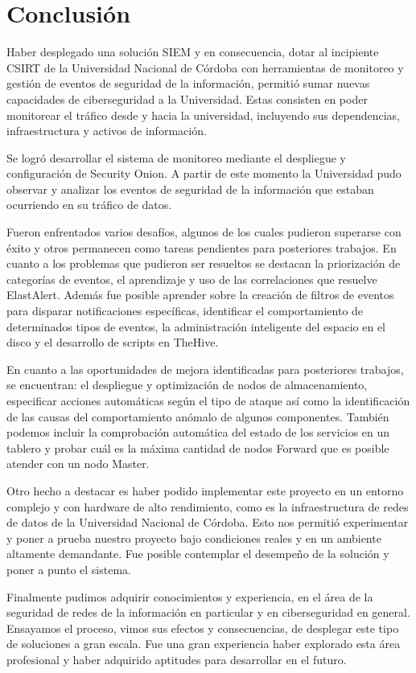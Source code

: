 \chapter{\Large Conclusión}
Haber desplegado una solución SIEM y en consecuencia, dotar al incipiente CSIRT de la Universidad Nacional de Córdoba con herramientas de monitoreo y gestión de eventos de seguridad de la información, permitió sumar nuevas capacidades de ciberseguridad a la Universidad. Estas consisten en poder monitorear el tráfico desde y hacia la universidad, incluyendo sus dependencias, infraestructura y activos de información.
 \par
Se logró desarrollar el sistema de monitoreo mediante el despliegue y configuración de Security Onion. A partir de este momento la Universidad pudo observar y analizar los eventos de seguridad de la información que estaban ocurriendo en su tráfico de datos.  \par
Fueron enfrentados varios desafíos, algunos de los cuales pudieron superarse con éxito y otros permanecen como tareas pendientes para posteriores trabajos. En cuanto a los problemas que pudieron ser resueltos se destacan la priorización de categorías de eventos, el aprendizaje y uso de las correlaciones que resuelve ElastAlert. Además fue posible aprender sobre la creación de filtros de eventos para disparar notificaciones específicas, identificar el comportamiento de determinados tipos de eventos, la administración inteligente del espacio en el disco y el desarrollo de scripts en TheHive. \par
En cuanto a las oportunidades de mejora identificadas para posteriores trabajos, se encuentran: el despliegue y optimización de nodos de almacenamiento, especificar acciones automáticas según el tipo de ataque así como la identificación de las causas del comportamiento anómalo de algunos componentes. También podemos incluir la comprobación automática del estado de los servicios en un tablero y probar cuál es la máxima cantidad de nodos Forward que es posible atender con un nodo Master. \par
Otro hecho a destacar es haber podido implementar este proyecto en un entorno complejo y con hardware de alto rendimiento, como es la infraestructura de redes de datos de la Universidad Nacional de Córdoba. Esto nos permitió experimentar y poner a prueba nuestro proyecto bajo condiciones reales y en un ambiente altamente demandante. Fue posible contemplar el desempeño de la solución y poner a punto el sistema. \par
Finalmente pudimos adquirir conocimientos y experiencia, en el área de la seguridad de redes de la información en particular y en ciberseguridad en general. Ensayamos el proceso, vimos sus efectos y consecuencias, de desplegar este tipo de soluciones a gran escala. Fue una gran experiencia haber explorado esta área profesional y haber adquirido aptitudes para desarrollar en el futuro. \par


